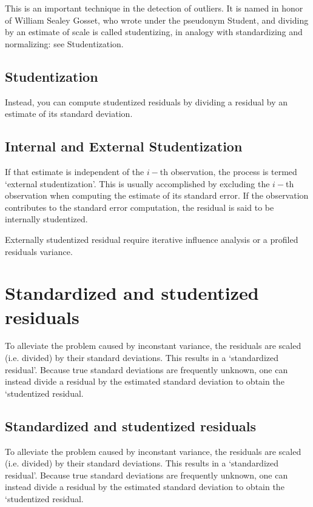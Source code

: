 \documentclass[Main.tex]{subfiles}
\begin{document}
This is an important technique in the detection of outliers. It is named in honor of William Sealey Gosset, who wrote under the pseudonym Student, and dividing by an estimate of scale is called studentizing, in analogy with standardizing and normalizing: see Studentization.

\subsection{Studentization} %
Instead, you can compute studentized residuals by dividing a residual by an estimate of its standard deviation. 

\subsection{Internal and External Studentization} %
If that estimate is independent of the $i-$th observation, the process is termed `external studentization'. This is usually accomplished by excluding the $i-$th observation when computing the estimate of its standard error. If the observation contributes to the
standard error computation, the residual is said to be internally studentized.

Externally  studentized residual require iterative influence analysis or a profiled residuals variance.

\section{Standardized and studentized residuals} %
To alleviate the problem caused by inconstant variance, the residuals are scaled (i.e. divided) by their standard deviations. This results in a `standardized residual'. Because true standard deviations are frequently unknown, one can instead divide a residual by the estimated standard deviation to obtain the `studentized residual. 

\subsection{Standardized and studentized residuals} %

To alleviate the problem caused by inconstant variance, the residuals are scaled (i.e. divided) by their standard deviations. This results in a `standardized residual'. Because true standard deviations are frequently unknown, one can instead divide a residual by the estimated standard deviation to obtain the `studentized residual. 
\end{document}
